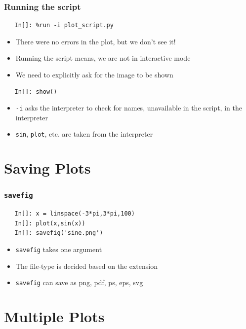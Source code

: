 \begin{frame}[fragile]
  \frametitle{Running the script}
  \begin{lstlisting}
   In[]: %run -i plot_script.py
  \end{lstlisting}
  \begin{itemize}
  \item There were no errors in the plot, but we don't see it!
  \item Running the script means, we are not in interactive mode
  \item We need to explicitly ask for the image to be shown
  \end{itemize}
  \begin{lstlisting}
   In[]: show()
  \end{lstlisting}
  \begin{itemize}
  \item \texttt{-i} asks the interpreter to check for names,
    unavailable in the script, in the interpreter
  \item \texttt{sin}, \texttt{plot}, etc. are taken from the
    interpreter
  \end{itemize}
\end{frame}

\section{Saving Plots}

\begin{frame}[fragile]
  \frametitle{\texttt{savefig}}
  \begin{lstlisting}
   In[]: x = linspace(-3*pi,3*pi,100)
   In[]: plot(x,sin(x))
   In[]: savefig('sine.png')
  \end{lstlisting}
  \begin{itemize}
  \item \texttt{savefig} takes one argument
  \item The file-type is decided based on the extension
  \item \texttt{savefig} can save as png, pdf, ps, eps, svg
  \end{itemize}
\end{frame}

\section{Multiple Plots}

